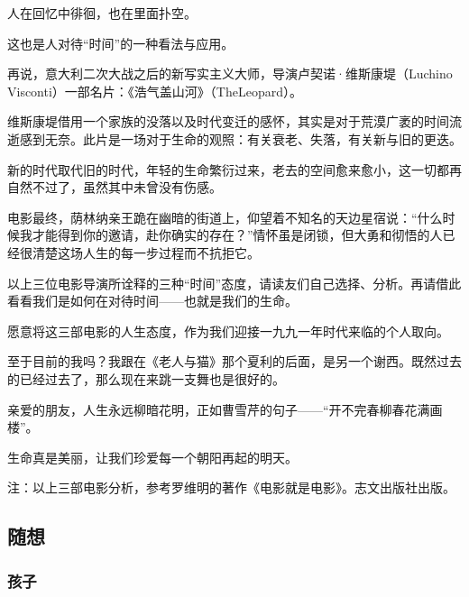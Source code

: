 \par 人在回忆中徘徊，也在里面扑空。
\par 这也是人对待“时间”的一种看法与应用。
\par 再说，意大利二次大战之后的新写实主义大师，导演卢契诺·维斯康堤（Luchino Visconti）一部名片：《浩气盖山河》（TheLeopard）。
\par 维斯康堤借用一个家族的没落以及时代变迁的感怀，其实是对于荒漠广袤的时间流逝感到无奈。此片是一场对于生命的观照：有关衰老、失落，有关新与旧的更迭。
\par 新的时代取代旧的时代，年轻的生命繁衍过来，老去的空间愈来愈小，这一切都再自然不过了，虽然其中未曾没有伤感。
\par 电影最终，荫林纳亲王跪在幽暗的街道上，仰望着不知名的天边星宿说：“什么时候我才能得到你的邀请，赴你确实的存在？”情怀虽是闭锁，但大勇和彻悟的人已经很清楚这场人生的每一步过程而不抗拒它。
\par 以上三位电影导演所诠释的三种“时间”态度，请读友们自己选择、分析。再请借此看看我们是如何在对待时间——也就是我们的生命。
\par 愿意将这三部电影的人生态度，作为我们迎接一九九一年时代来临的个人取向。
\par 至于目前的我吗？我跟在《老人与猫》那个夏利的后面，是另一个谢西。既然过去的已经过去了，那么现在来跳一支舞也是很好的。
\par 亲爱的朋友，人生永远柳暗花明，正如曹雪芹的句子——“开不完春柳春花满画楼”。
\par 生命真是美丽，让我们珍爱每一个朝阳再起的明天。
\par 注：以上三部电影分析，参考罗维明的著作《电影就是电影》。志文出版社出版。









\subsection{随想}



\subsubsection{孩子}


